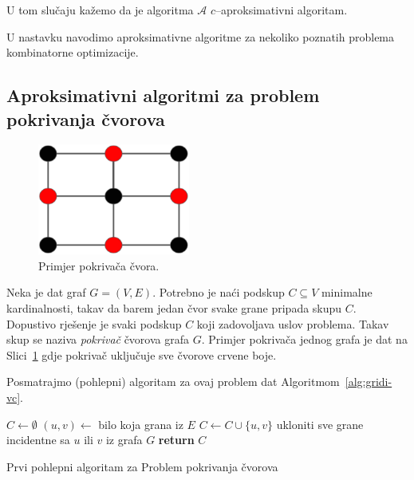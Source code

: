 \documentclass[a4paper, utf8, 11pt, colorlinks]{book}
\theoremstyle{definition}
\begin{document}
 U tom slučaju kažemo da je algoritma $\mathcal{A}$ $c$--aproksimativni algoritam.

  
  
   U nastavku navodimo  aproksimativne algoritme za nekoliko poznatih problema kombinatorne optimizacije. 
  
  \subsection{Aproksimativni algoritmi za problem pokrivanja čvorova}\label{sec:aprokspokrivanjecvorova}
  
    \begin{figure}
  	\centering
  	\includegraphics[width=50mm]{vertex-cover.eps}

  	\caption{Primjer pokrivača čvora.}   	\label{fig:vertex-cover}
  \end{figure}
  Neka je dat graf $G=(V,E)$. Potrebno je naći podskup $C\subseteq V$ minimalne kardinalnosti, takav da barem jedan čvor svake grane pripada skupu $C$.  Dopustivo rješenje je svaki podskup $C$ koji zadovoljava uslov problema. Takav skup se naziva \emph{pokrivač} čvorova grafa $G$. Primjer pokrivača jednog grafa je dat na Slici~\ref{fig:vertex-cover} gdje pokrivač uključuje sve čvorove crvene boje. 
  

  
  Posmatrajmo (pohlepni) algoritam za ovaj problem dat Algoritmom~\ref{alg:gridi-vc}. 
  
  \begin{algorithm}[H] 
  	\begin{algorithmic}[1]
  		\STATE $C \gets \emptyset$
  		\STATE $(u,v) \gets$ bilo koja grana iz $E$
  		\STATE $C \gets C \cup \{u,v\}$
  		\STATE ukloniti sve grane incidentne sa  $u$ ili $v$ iz grafa $G$
  		\ENDWHILE
  		\STATE \textbf{return} $C$
  	\end{algorithmic}   
   
     \caption{Prvi pohlepni algoritam za Problem pokrivanja čvorova}
 \label{alg:gridi-vc}
  \end{algorithm}
  
\end{document}
